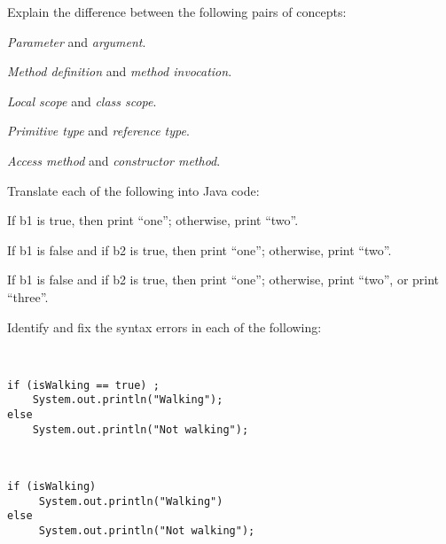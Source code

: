 \begin{EXRtwo}
\baselineskip=11pt\item  Explain the difference between the following pairs of
concepts:

\begin{EXRtwoLL}
\item  {\it Parameter} and {\it argument}.
\item  {\it Method definition} and {\it method invocation}.
\item  {\it Local scope} and {\it class scope}.
\item  {\it Primitive type} and {\it reference type}.
\item  {\it Access method} and {\it constructor method}.
\end{EXRtwoLL}


\item  Translate each of the following into Java code:
\begin{EXRtwoLL}
\item %
If b1 is true, then print ``one''; otherwise, print ``two''.
%
\item %
If b1 is false and if b2 is true,  then print ``one''; otherwise, print ``two''.
%
\item %
If b1 is false and if b2 is true,  then print ``one'';
otherwise, print ``two'', or print ``three''.
%
\end{EXRtwoLL}

\item  Identify and fix the syntax errors in each of the following:

\begin{EXRtwoLL}
\item \mbox{ }

\begin{jjjlisting}
\begin{lstlisting}
if (isWalking == true) ;
    System.out.println("Walking");
else
    System.out.println("Not walking");
\end{lstlisting}
\end{jjjlisting}

\item \mbox{ }

\begin{jjjlisting}
\begin{lstlisting}
if (isWalking)
     System.out.println("Walking")
else
     System.out.println("Not walking");
\end{lstlisting}
\end{jjjlisting}

\item \mbox{ }


\end{EXRtwoLL}
\end{EXRtwo}
